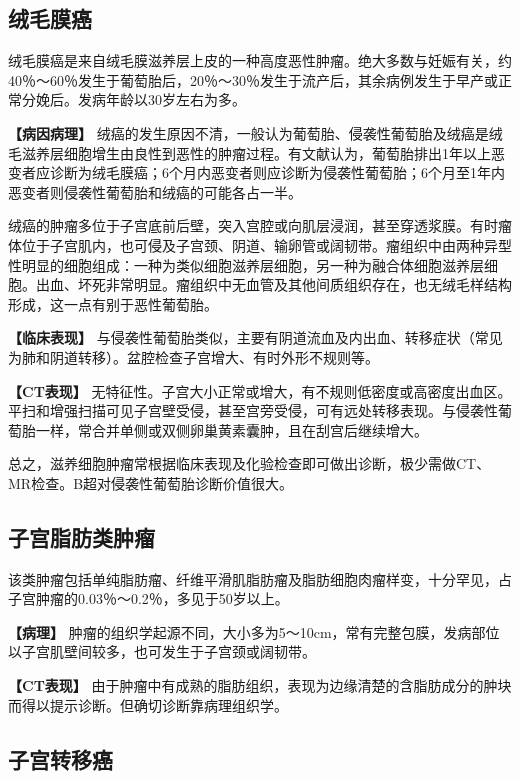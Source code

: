 \subsection{绒毛膜癌}

绒毛膜癌是来自绒毛膜滋养层上皮的一种高度恶性肿瘤。绝大多数与妊娠有关，约40％～60％发生于葡萄胎后，20％～30％发生于流产后，其余病例发生于早产或正常分娩后。发病年龄以30岁左右为多。

\textbf{【病因病理】}
绒癌的发生原因不清，一般认为葡萄胎、侵袭性葡萄胎及绒癌是绒毛滋养层细胞增生由良性到恶性的肿瘤过程。有文献认为，葡萄胎排出1年以上恶变者应诊断为绒毛膜癌；6个月内恶变者则应诊断为侵袭性葡萄胎；6个月至1年内恶变者则侵袭性葡萄胎和绒癌的可能各占一半。

绒癌的肿瘤多位于子宫底前后壁，突入宫腔或向肌层浸润，甚至穿透浆膜。有时瘤体位于子宫肌内，也可侵及子宫颈、阴道、输卵管或阔韧带。瘤组织中由两种异型性明显的细胞组成：一种为类似细胞滋养层细胞，另一种为融合体细胞滋养层细胞。出血、坏死非常明显。瘤组织中无血管及其他间质组织存在，也无绒毛样结构形成，这一点有别于恶性葡萄胎。

\textbf{【临床表现】}
与侵袭性葡萄胎类似，主要有阴道流血及内出血、转移症状（常见为肺和阴道转移）。盆腔检查子宫增大、有时外形不规则等。

\textbf{【CT表现】}
无特征性。子宫大小正常或增大，有不规则低密度或高密度出血区。平扫和增强扫描可见子宫壁受侵，甚至宫旁受侵，可有远处转移表现。与侵袭性葡萄胎一样，常合并单侧或双侧卵巢黄素囊肿，且在刮宫后继续增大。

总之，滋养细胞肿瘤常根据临床表现及化验检查即可做出诊断，极少需做CT、MR检查。B超对侵袭性葡萄胎诊断价值很大。

\subsection{子宫脂肪类肿瘤}

该类肿瘤包括单纯脂肪瘤、纤维平滑肌脂肪瘤及脂肪细胞肉瘤样变，十分罕见，占子宫肿瘤的0.03％～0.2％，多见于50岁以上。

\textbf{【病理】}
肿瘤的组织学起源不同，大小多为5～10cm，常有完整包膜，发病部位以子宫肌壁间较多，也可发生于子宫颈或阔韧带。

\textbf{【CT表现】}
由于肿瘤中有成熟的脂肪组织，表现为边缘清楚的含脂肪成分的肿块而得以提示诊断。但确切诊断靠病理组织学。

\subsection{子宫转移癌}

